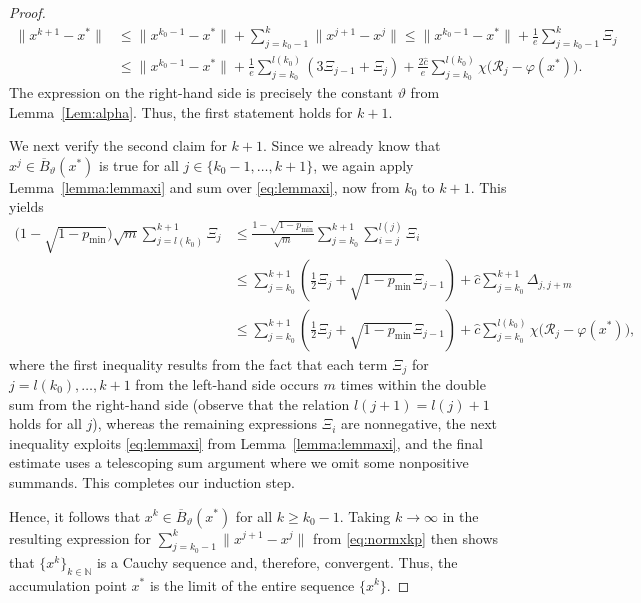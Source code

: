 \documentclass[a4paper, 12pt]{article}
\numberwithin{equation}{section}
\theoremstyle{bolddef}
\theoremstyle{definition}
\theoremstyle{boldplain}
\newcommand{\xk}{x^k}
\newcommand{\xkp}{x^{k+1}}
\newcommand{\xj}{x^j}
\newcommand{\xjp}{x^{j+1}}
\newcommand{\pmin}{p_{\min}}
\newcommand{\Rvalue}{\mathcal{R}}
\newcommand{\clball}{\overline{B}}
\begin{document}
\begin{proof}
\begin{equation}\label{eq:normxkp}
\begin{aligned}
	\|\xkp - x^*\| & \leq \| x^{k_0-1} - x^* \| + \sum_{j = k_0-1}^k \| \xjp - \xj\| \leq \| x^{k_0-1} - x^* \| + \frac{1}{e} \sum_{j=k_0-1}^k \Xi_j\\
	&\leq \| x^{k_0-1} - x^*\| + \frac{1}{e} \sum_{j=k_0}^{l(k_0)} (3 \Xi_{j-1} + \Xi_j) + \frac{2 \hat c}{e} \sum_{j = k_0}^{l(k_0)}\chi \big( \Rvalue_j - \varphi(x^*) \big).
\end{aligned}
\end{equation}
The expression on the right-hand side is precisely the constant
$ \vartheta $ from Lemma~\ref{Lem:alpha}. Thus, the first statement holds 
for $k+1$.

We next verify the second claim for $k+1$. Since we already know that $\xj \in \clball_\vartheta(x^*)$ is true for all $j \in \{k_0-1, \dots, k+1\}$, we again apply Lemma~\ref{lemma:lemmaxi} and sum over \eqref{eq:lemmaxi}, now from $k_0$ to $k+1$. This yields
\begin{align*}
   \big( 1-\sqrt{1-\pmin} \big) \sqrt{m} 
   \sum_{j=l(k_0)}^{k+1} \Xi_j & 
   \leq \frac{1-\sqrt{1-\pmin}}{\sqrt{m}} \sum_{j=k_0}^{k+1} \sum_{i=j}^{l(j)} \Xi_i\\
	&\leq \sum_{j=k_0}^{k+1} \left(\frac{1}{2} \Xi_j + \sqrt{1-\pmin} \Xi_{j-1}\right) + \hat c \sum_{j =k_0}^{k+1} \Delta_{j, j+m}\\
	&\leq \sum_{j=k_0}^{k+1} \left(\frac{1}{2} \Xi_j + \sqrt{1-\pmin} \Xi_{j-1}\right) + \hat c \sum_{j =k_0}^{l(k_0)} \chi \big( \Rvalue_j - \varphi(x^*) \big),
\end{align*}
where the first inequality results from the fact that each term
$ \Xi_j $ for $ j = l(k_0), \ldots, k+1 $ from the left-hand side
occurs $ m $ times within the double sum from the right-hand side
(observe that the relation $ l(j+1) = l(j)+1 $ holds for all $ j $),
whereas the remaining expressions $ \Xi_i $ are nonnegative,
the next inequality exploits \eqref{eq:lemmaxi} from 
Lemma~\ref{lemma:lemmaxi}, and the final estimate uses a telescoping 
sum argument where we omit some nonpositive summands. This completes our induction step.

Hence, it follows that $\xk \in \clball_\vartheta(x^*)$ for all $k \geq k_0-1$.
Taking $k \to \infty$ in the resulting expression for $\sum_{j = k_0-1}^k
\| \xjp- \xj \|$ from \eqref{eq:normxkp} then shows that 
$\{\xk \}_{k \in \mathbb{N}}$ is a Cauchy sequence and, therefore,
convergent. Thus, the accumulation point $x^*$ is the limit of the 
entire sequence $ \{ \xk \} $.
\end{proof}
\end{document}
